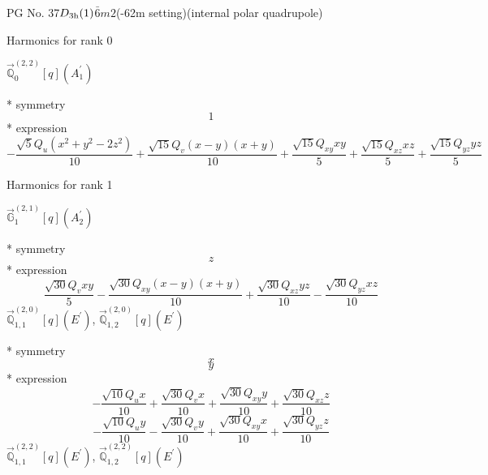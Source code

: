 \documentclass[fleqn,8pt]{jsarticle}
\begin{document}
\setcounter{MaxMatrixCols}{32}

\renewcommand{\tablename}{Table~}
\renewcommand{\figurename}{Figure~}
\begin{center}
\LARGE
PG No. 37\quad$D_{\rm 3h}(1)$\quad$\bar{6}m2$\quad(-62m setting)\quad[ hexagonal ] (internal polar quadrupole)
\end{center}

\noindent * Harmonics for rank 0

\noindent\quad $\vec{\mathbb{Q}}_{0}^{(2,2)}[q](A_{1}^{\prime})$

\noindent\quad ** symmetry
\begin{dmath*}
1
\end{dmath*}
\noindent\quad ** expression
\begin{dmath*}
- \frac{\sqrt{5} Q_{u} \left(x^{2} + y^{2} - 2 z^{2}\right)}{10} + \frac{\sqrt{15} Q_{v} \left(x - y\right) \left(x + y\right)}{10} + \frac{\sqrt{15} Q_{xy} x y}{5} + \frac{\sqrt{15} Q_{xz} x z}{5} + \frac{\sqrt{15} Q_{yz} y z}{5}
\end{dmath*}

\noindent * Harmonics for rank 1

\noindent\quad $\vec{\mathbb{G}}_{1}^{(2,1)}[q](A_{2}^{\prime})$

\noindent\quad ** symmetry
\begin{dmath*}
z
\end{dmath*}
\noindent\quad ** expression
\begin{dmath*}
\frac{\sqrt{30} Q_{v} x y}{5} - \frac{\sqrt{30} Q_{xy} \left(x - y\right) \left(x + y\right)}{10} + \frac{\sqrt{30} Q_{xz} y z}{10} - \frac{\sqrt{30} Q_{yz} x z}{10}
\end{dmath*}
\noindent\quad $\vec{\mathbb{Q}}_{1,1}^{(2,0)}[q](E^{\prime})$, $\vec{\mathbb{Q}}_{1,2}^{(2,0)}[q](E^{\prime})$

\noindent\quad ** symmetry
\begin{dmath*}
x
\end{dmath*}
\begin{dmath*}
y
\end{dmath*}
\noindent\quad ** expression
\begin{dmath*}
- \frac{\sqrt{10} Q_{u} x}{10} + \frac{\sqrt{30} Q_{v} x}{10} + \frac{\sqrt{30} Q_{xy} y}{10} + \frac{\sqrt{30} Q_{xz} z}{10}
\end{dmath*}
\begin{dmath*}
- \frac{\sqrt{10} Q_{u} y}{10} - \frac{\sqrt{30} Q_{v} y}{10} + \frac{\sqrt{30} Q_{xy} x}{10} + \frac{\sqrt{30} Q_{yz} z}{10}
\end{dmath*}
\noindent\quad $\vec{\mathbb{Q}}_{1,1}^{(2,2)}[q](E^{\prime})$, $\vec{\mathbb{Q}}_{1,2}^{(2,2)}[q](E^{\prime})$
\end{document}
